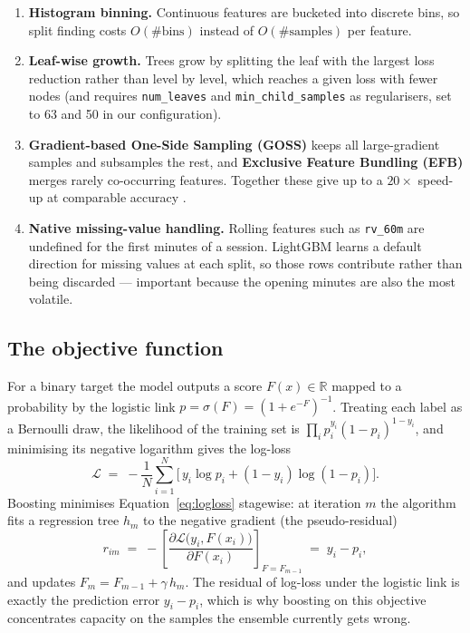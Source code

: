 \documentclass[11pt,a4paper]{article}
\newcommand{\code}[1]{\texttt{#1}}
\begin{document}
\begin{enumerate}
  \item \textbf{Histogram binning.} Continuous features are bucketed into discrete bins,
        so split finding costs $O(\#\text{bins})$ instead of $O(\#\text{samples})$ per
        feature.
  \item \textbf{Leaf-wise growth.} Trees grow by splitting the leaf with the largest
        loss reduction rather than level by level, which reaches a given loss with fewer
        nodes (and requires \code{num\_leaves} and \code{min\_child\_samples} as
        regularisers, set to 63 and 50 in our configuration).
  \item \textbf{Gradient-based One-Side Sampling (GOSS)} keeps all large-gradient
        samples and subsamples the rest, and \textbf{Exclusive Feature Bundling (EFB)}
        merges rarely co-occurring features. Together these give up to a $20\times$
        speed-up at comparable accuracy \cite{lightgbm}.
  \item \textbf{Native missing-value handling.} Rolling features such as
        \code{rv\_60m} are undefined for the first minutes of a session. LightGBM learns
        a default direction for missing values at each split, so those rows contribute
        rather than being discarded --- important because the opening minutes are also
        the most volatile.
\end{enumerate}

\subsection{The objective function}

For a binary target the model outputs a score $F(x)\in\mathbb{R}$ mapped to a probability
by the logistic link $p = \sigma(F) = (1+e^{-F})^{-1}$. Treating each label as a
Bernoulli draw, the likelihood of the training set is
$\prod_i p_i^{y_i}(1-p_i)^{1-y_i}$, and minimising its negative logarithm gives the
log-loss
\begin{equation}
\mathcal{L} \;=\; -\frac{1}{N}\sum_{i=1}^{N}\Big[\,y_i\log p_i + (1-y_i)\log(1-p_i)\Big].
\label{eq:logloss}
\end{equation}
Boosting minimises Equation~\eqref{eq:logloss} stagewise: at iteration $m$ the algorithm
fits a regression tree $h_m$ to the negative gradient (the pseudo-residual)
\begin{equation}
r_{im} \;=\; -\left[\frac{\partial \mathcal{L}\big(y_i, F(x_i)\big)}{\partial F(x_i)}
\right]_{F=F_{m-1}} \;=\; y_i - p_i ,
\end{equation}
and updates $F_m = F_{m-1} + \gamma\, h_m$. The residual of log-loss under the logistic
link is exactly the prediction error $y_i - p_i$, which is why boosting on this objective
concentrates capacity on the samples the ensemble currently gets wrong.
\end{document}
